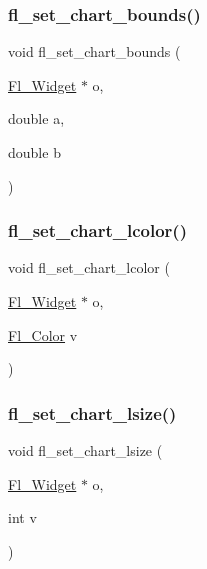\mbox{\label{forms_8_h_a60e6b1a372ea51177c0b010db68903a4}} 
\subsubsection{\texorpdfstring{fl\+\_\+set\+\_\+chart\+\_\+bounds()}{fl\_set\_chart\_bounds()}}
{\footnotesize\ttfamily void fl\+\_\+set\+\_\+chart\+\_\+bounds (\begin{DoxyParamCaption}\item[{\hyperlink{class_fl___widget}{Fl\+\_\+\+Widget} $\ast$}]{o,  }\item[{double}]{a,  }\item[{double}]{b }\end{DoxyParamCaption})\hspace{0.3cm}{\ttfamily [inline]}}

\mbox{\label{forms_8_h_a1b9d678a060bb25a2e58ce6baef7d6f0}} 
\subsubsection{\texorpdfstring{fl\+\_\+set\+\_\+chart\+\_\+lcolor()}{fl\_set\_chart\_lcolor()}}
{\footnotesize\ttfamily void fl\+\_\+set\+\_\+chart\+\_\+lcolor (\begin{DoxyParamCaption}\item[{\hyperlink{class_fl___widget}{Fl\+\_\+\+Widget} $\ast$}]{o,  }\item[{\hyperlink{_enumerations_8_h_a8b762953646f8abee866061f1af78a6a}{Fl\+\_\+\+Color}}]{v }\end{DoxyParamCaption})\hspace{0.3cm}{\ttfamily [inline]}}

\mbox{\label{forms_8_h_a99097b52f87bee6c0ac3795d90da2ca1}} 
\subsubsection{\texorpdfstring{fl\+\_\+set\+\_\+chart\+\_\+lsize()}{fl\_set\_chart\_lsize()}}
{\footnotesize\ttfamily void fl\+\_\+set\+\_\+chart\+\_\+lsize (\begin{DoxyParamCaption}\item[{\hyperlink{class_fl___widget}{Fl\+\_\+\+Widget} $\ast$}]{o,  }\item[{int}]{v }\end{DoxyParamCaption})\hspace{0.3cm}{\ttfamily [inline]}}

